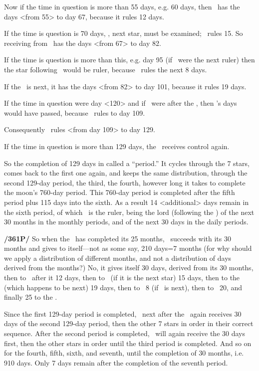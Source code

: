 Now if the time in question is more than 55 days, e.g. 60 days, then \Jupiter\, has the days <from 55> to day 67, because it rules 12 days. 

If the time is question is 70 days, \Mars, next star, must be examined; \Mars\, rules 15. So \Mars\, receiving from \Jupiter\, has the days <from 67> to day 82. 

If the time is question is more than this, e.g. day 95 (if \Venus\, were the next ruler) then the star following \Venus\, would be ruler, because \Venus\, rules the next 8 days. 

If the \Sun\, is next, it has the days <from 82> to day 101, because it rules 19 days. 

If the time in question were day <120> and if \Venus\, were after the \Sun, then \Venus’s days would have passed, because \Venus\, rules to day 109.

Consequently \Mercury\, rules <from day 109> to day 129. 

If the time in question is more than 129 days, the \Moon\, receives control again.

So the completion of 129 days in called a “period.” It cycles through the 7 stars, comes back to the first one again, and keeps the same distribution, through the second 129-day period, the third, the fourth,
however long it takes to complete the moon’s 760-day period. This 760-day period is completed after the fifth period plus 115 days into the sixth. As a result 14 <additional> days remain in the sixth period, of which \Saturn\, is the ruler, being the lord (following the \Moon) of the next 30 months in the monthly periods, and of the next 30 days in the daily periods. 

\textbf{/361P/} So when the \Moon\, has completed its 25 months, \Saturn\, succeeds with its 30 months and gives to itself—not as some say, 210 days=7 months (for why should we apply a distribution of different months, and not a distribution of days derived from the
months?) No, it gives itself 30 days, derived from its 30 months, then to \Jupiter\, after it 12 days, then to \Mars\, (if it is the next star) 15 days, then to the \Sun\, (which happens to be next) 19 days, then to \Venus\, 8 (if \Venus\, is next), then to \Mercury\, 20, and finally 25 to the \Moon.

Since the first 129-day period is completed, \Saturn\, next after the \Moon\, again receives 30 days of the second 129-day period, then the other 7 stars in order in their correct sequence. After the second period is completed, \Saturn\, will again receive the 30 days first, then the other stars in order until the third period is completed. And so on for the fourth, fifth, sixth, and seventh, until the completion of 30 months, i.e. 910 days. Only 7 days remain after the completion of the seventh period.


